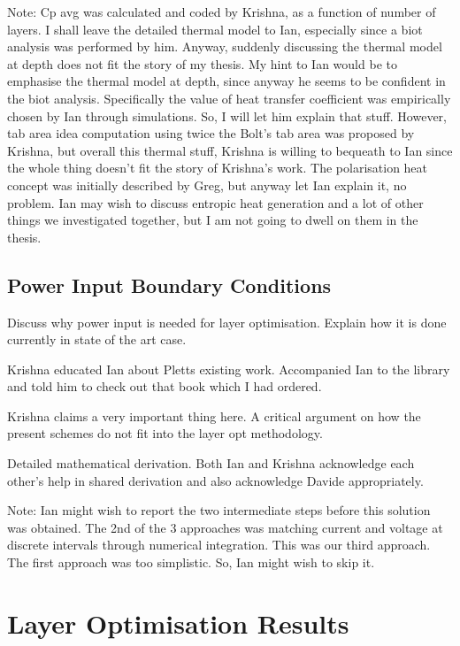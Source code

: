 Note: Cp  avg was calculated and  coded by Krishna,  as a function of  number of
layers. I shall leave the detailed thermal model to Ian, especially since a biot
analysis was performed by him. Anyway,  suddenly discussing the thermal model at
depth does not fit the story of my  thesis. My hint to Ian would be to emphasise
the thermal model  at depth, since anyway  he seems to be confident  in the biot
analysis. Specifically  the value of  heat transfer coefficient  was empirically
chosen  by Ian  through simulations.  So,  I will  let him  explain that  stuff.
However, tab area idea computation using  twice the Bolt's tab area was proposed
by Krishna,  but overall this thermal  stuff, Krishna is willing  to bequeath to
Ian  since  the  whole thing  doesn't  fit  the  story  of Krishna's  work.  The
polarisation heat  concept was initially described  by Greg, but anyway  let Ian
explain it, no problem.  Ian may wish to discuss entropic  heat generation and a
lot of  other things we investigated  together, but I  am not going to  dwell on
them in the thesis.


\subsection{Power Input Boundary Conditions}

Discuss why power input is needed for layer optimisation. Explain how it is done
currently in state of the art case.

Krishna educated Ian about Pletts existing  work. Accompanied Ian to the library
and told him to check out that book which I had ordered.

Krishna  claims a  very important  thing here.  A critical  argument on  how the
present schemes do not fit into the layer opt methodology.

Detailed mathematical derivation. Both Ian  and Krishna acknowledge each other's
help in shared derivation and also acknowledge Davide appropriately.

Note: Ian might  wish to report the two intermediate  steps before this solution
was obtained. The  2nd of the 3  approaches was matching current  and voltage at
discrete intervals through  numerical integration. This was  our third approach.
The first approach was too simplistic. So, Ian might wish to skip it.



\section{Layer Optimisation Results}

